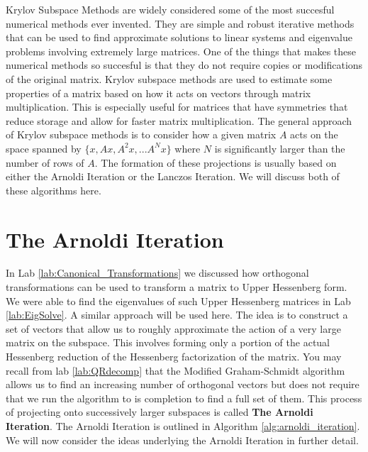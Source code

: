 \label{lab:kry_arnoldi}


Krylov Subspace Methods are widely considered some of the most succesful numerical methods ever invented.
They are simple and robust iterative methods that can be used to find approximate solutions to linear systems and eigenvalue problems involving extremely large matrices.
One of the things that makes these numerical methods so succesful is that they do not require copies or modifications of the original matrix.
Krylov subspace methods are used to estimate some properties of a matrix based on how it acts on vectors through matrix multiplication.
This is especially useful for matrices that have symmetries that reduce storage and allow for faster matrix multiplication.
The general approach of Krylov subspace methods is to consider how a given matrix $A$ acts on the space spanned by $\lbrace x, Ax, A^2 x, ...A^N x \rbrace$ where $N$ is significantly larger than the number of rows of $A$.
The formation of these projections is usually based on either the Arnoldi Iteration or the Lanczos Iteration.
We will discuss both of these algorithms here.

\section*{The Arnoldi Iteration}

In Lab \ref{lab:Canonical_Transformations} we discussed how orthogonal transformations can be used to transform a matrix to Upper Hessenberg form.
We were able to find the eigenvalues of such Upper Hessenberg matrices in Lab \ref{lab:EigSolve}.
A similar approach will be used here.
The idea is to construct a set of vectors that allow us to roughly approximate the action of a very large matrix on the subspace.
This involves forming only a portion of the actual Hessenberg reduction of the Hessenberg factorization of the matrix.
You may recall from lab \ref{lab:QRdecomp} that the Modified Graham-Schmidt algorithm allows us to find an increasing number of orthogonal vectors but does not require that we run the algorithm to is completion to find a full set of them.
This process of projecting onto successively larger subspaces is called \textbf{The Arnoldi Iteration}.
The Arnoldi Iteration is outlined in Algorithm \ref{alg:arnoldi_iteration}.
We will now consider the ideas underlying the Arnoldi Iteration in further detail.

